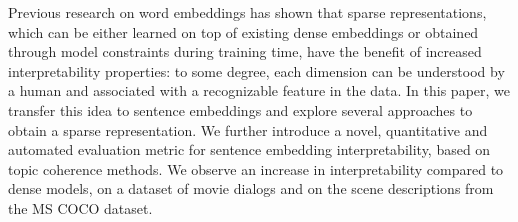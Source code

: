 Previous research on word embeddings has shown that sparse representations, which can be either learned on top of existing dense embeddings or obtained through model constraints during training time, have the benefit of increased interpretability properties: to some degree, each dimension can be understood by a human and associated with a recognizable feature in the data. In this paper, we transfer this idea to sentence embeddings and explore several approaches to obtain a sparse representation. We further introduce a novel, quantitative and automated evaluation metric for sentence embedding interpretability, based on topic coherence methods. We observe an increase in interpretability compared to dense models, on a dataset of movie dialogs and on the scene descriptions from the MS COCO dataset.
